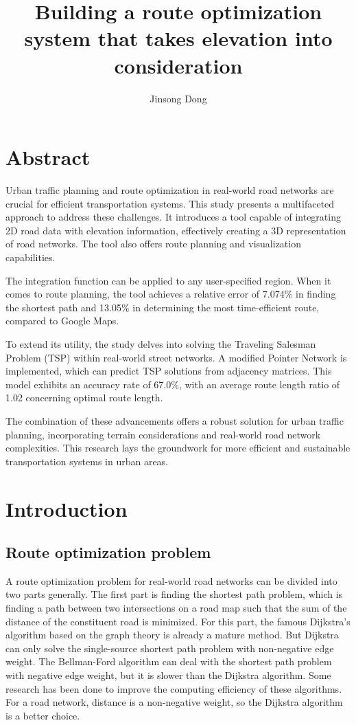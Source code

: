 \documentclass[final-report]{report-template}
\title{Building a route optimization system that takes elevation into consideration}
\author{Jinsong Dong}
\begin{document}
\maketitlepage  %

\section* {Abstract}
Urban traffic planning and route optimization in real-world road networks are crucial for efficient transportation systems. 
This study presents a multifaceted approach to address these challenges. 
It introduces a tool capable of integrating 2D road data with elevation information, 
effectively creating a 3D representation of road networks. 
The tool also offers route planning and visualization capabilities.

The integration function can be applied to any user-specified region. 
When it comes to route planning, 
the tool achieves a relative error of 7.074\% in finding the shortest path and 13.05\% in determining the most time-efficient route, 
compared to Google Maps.

To extend its utility, the study delves into solving the Traveling Salesman Problem (TSP) within real-world street networks. 
A modified Pointer Network is implemented, which can predict TSP solutions from adjacency matrices. 
This model exhibits an accuracy rate of 67.0\%, with an average route length ratio of 1.02 concerning optimal route length.

The combination of these advancements offers a robust solution for urban traffic planning, 
incorporating terrain considerations and real-world road network complexities. 
This research lays the groundwork for more efficient and sustainable transportation systems in urban areas.

\section {Introduction}
\subsection {Route optimization problem}
A route optimization problem for real-world road networks can be divided into two parts generally.
The first part is finding the shortest path problem, 
which is finding a path between two intersections on a road map such that the sum of the distance of the constituent road is minimized.
For this part, the famous Dijkstra's algorithm\cite{Dijkstra:1959aa} based on the graph theory is already a mature method.
But Dijkstra can only solve the single-source shortest path problem with non-negative edge weight.
The Bellman-Ford algorithm\cite{bellman} can deal with the shortest path problem with negative edge weight, 
but it is slower than the Dijkstra algorithm.
Some research has been done to improve the computing efficiency of these algorithms\cite {journals/tpds/BusatoB16}.
For a road network, distance is a non-negative weight, so the Dijkstra algorithm is a better choice.
\end{document}

